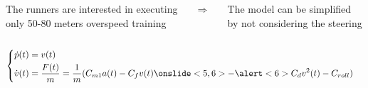 \documentclass[10pt, aspectratio=169]{beamer}
\begin{document}
\begin{frame}[t]
\begin{columns}
\begin{column}{0.5\textwidth}
\hspace{0.8cm} 
 The runners are interested in executing \\
\hspace{0.9cm} only 50-80 meters overspeed training 
\end{column}
\begin{column}{0.1\textwidth}
 $\Rightarrow$
\end{column}
\begin{column}{0.4\textwidth}
\hspace{-0.5cm}
 The model can be simplified \\
\hspace{-0.6cm} by not considering the steering
\end{column}
\end{columns}

\vspace{0.6cm}

\begin{columns}
\hspace{0.8cm}
\begin{column}{0.4\textwidth}
\vspace{-0.5cm}
\begin{equation*}
	\begin{cases}
 	\begin{aligned}
		\dot{p}(t) &= v(t) \\
		\dot{v}(t) &= \frac{F(t)}{m} = \frac{1}{m} (C_{m1} a(t) - C_f v(t) \onslide<5,6>{- \alert<6>{C_d v^2(t) - C_{roll}})}
	\end{aligned}
	\end{cases}
\end{equation*}
\end{column}


\end{columns}
\end{frame}
\end{document}
